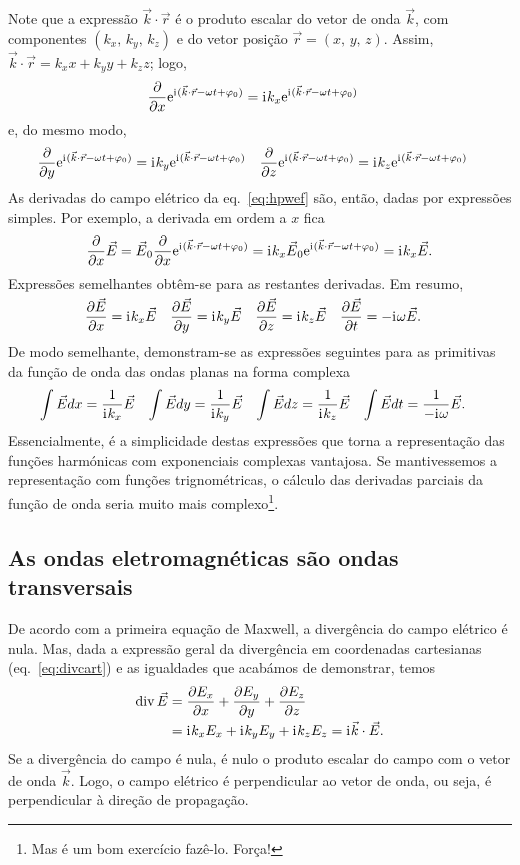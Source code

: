 Note que a expressão $\vec k\cdot\vec r$ é o produto escalar do vetor de onda
$\vec k$, com componentes $(k_x,\,k_y,\,k_z)$ e do vetor posição
$\vec r=(x,\,y,\,z)$. Assim, $\vec k\cdot\vec r=k_xx+k_yy+k_zz$;
logo,
\begin{align*}
  \pd{}{x}\e^{\iu(\vec k\cdot\vec r-\omega t+\varphi_0)}&=
  \iu k_x\e^{\iu(\vec k\cdot\vec r-\omega t+\varphi_0)}
\end{align*}
e, do mesmo modo,
\begin{align*}
  \pd{}{y}\e^{\iu(\vec k\cdot\vec r-\omega t+\varphi_0)}&=
  \iu k_y\e^{\iu(\vec k\cdot\vec r-\omega t+\varphi_0)}&
  \pd{}{z}\e^{\iu(\vec k\cdot\vec r-\omega t+\varphi_0)}&=
  \iu k_z\e^{\iu(\vec k\cdot\vec r-\omega t+\varphi_0)}
\end{align*}
As derivadas do campo elétrico da eq.~\eqref{eq:hpwef} são, então, dadas por
expressões simples. Por exemplo, a derivada em ordem a $x$ fica
\begin{equation*}
  \pd{}{x}\vec E=\vec E_0\pd{}{x}\e^{\iu(\vec k\cdot\vec r-\omega t+\varphi_0)}=
  \iu k_x\vec E_0\e^{\iu(\vec k\cdot\vec r-\omega t+\varphi_0)}=
  \iu k_x \vec E.
\end{equation*}
Expressões semelhantes obtêm-se para as restantes derivadas. Em resumo,
\begin{align*}
  \pd{\vec E}{x}&=\iu k_x\vec E&
  \pd{\vec E}{y}&=\iu k_y\vec E&
  \pd{\vec E}{z}&=\iu k_z\vec E&
  \pd{\vec E}{t}&=-\iu \omega\vec E.
\end{align*}
De modo semelhante, demonstram-se as expressões seguintes para as primitivas da
função de onda das ondas planas na forma complexa
\begin{align*}
\int \vec E dx&=\frac{1}{\iu k_x}\vec E&
\int \vec E dy&=\frac{1}{\iu k_y}\vec E&
\int \vec E dz&=\frac{1}{\iu k_z}\vec E&
\int \vec E dt&=\frac{1}{-\iu \omega}\vec E.
\end{align*}
Essencialmente, é a simplicidade destas expressões que torna a representação das
funções harmónicas com exponenciais complexas vantajosa. Se mantivessemos a
representação com funções trignométricas, o cálculo das derivadas parciais da
função de onda seria muito mais complexo\footnote{Mas é um bom exercício
fazê-lo.  Força!}.

\subsection*{As ondas eletromagnéticas são ondas transversais}
De acordo com a primeira equação de Maxwell, a divergência do campo elétrico é
nula. Mas, dada a expressão geral da divergência em coordenadas cartesianas 
(eq.~\eqref{eq:divcart}) e as igualdades que acabámos de demonstrar, temos
\begin{align*}
  \div\vec E&=\pd{E_x}{x}+\pd{E_y}{y}+\pd{E_z}{z}\\
            &=\iu k_x E_x+\iu k_y E_y+\iu k_z E_z=\iu\vec k\cdot\vec E.
\end{align*}
Se a divergência do campo é nula, é nulo o produto escalar do campo com o vetor
de onda $\vec k$. Logo, o campo elétrico é perpendicular ao vetor de onda, ou
seja, é perpendicular à direção de propagação.

